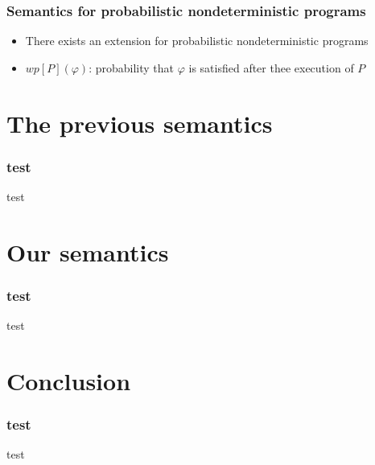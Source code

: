 \documentclass{beamer}
\begin{document}
\begin{frame}
\frametitle{Semantics for probabilistic nondeterministic programs}
\begin{itemize}
\item<1-> There exists an extension for probabilistic nondeterministic programs
\item<2-> $wp[P](\varphi)$: probability that $\varphi$ is satisfied after thee execution of $P$
\end{itemize}
\end{frame}

\section{The previous semantics}

\begin{frame}
\frametitle{test}
test
\end{frame}

\section{Our semantics}

\begin{frame}
\frametitle{test}
test
\end{frame}

\section{Conclusion}

\begin{frame}
\frametitle{test}
test
\end{frame}
\end{document}
